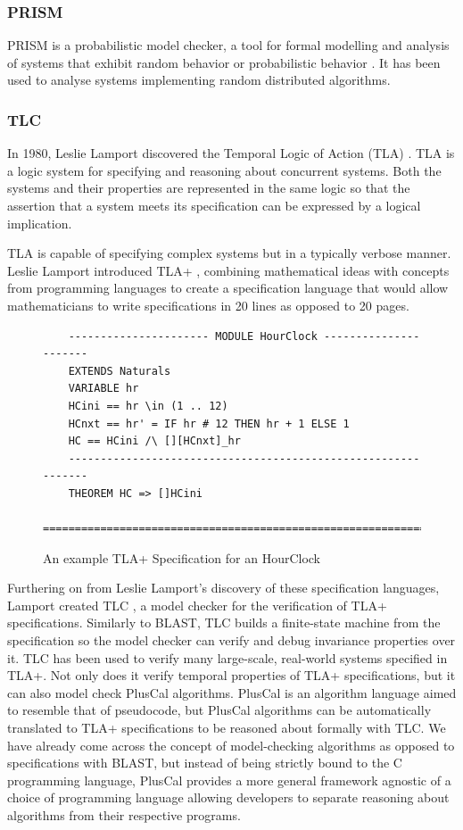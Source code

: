 \subsubsection*{\textbf{PRISM}}
PRISM is a probabilistic model checker, a tool for formal modelling and analysis of systems that exhibit random behavior or probabilistic behavior \cite{prism}. It has been used to analyse systems implementing random distributed algorithms.

\subsubsection*{\textbf{TLC}}
In 1980, Leslie Lamport discovered the Temporal Logic of Action (TLA) \cite{tla}. TLA is a logic system for specifying and reasoning about concurrent systems. Both the systems and their properties are represented in the same logic so that the assertion that a system meets its specification can be expressed by a logical implication.
\par
TLA is capable of specifying complex systems but in a typically verbose manner. Leslie Lamport introduced TLA+ \cite{tlaplus}, combining mathematical ideas with concepts from programming languages to create a specification language that would allow mathematicians to write specifications in 20 lines as opposed to 20 pages.
\begin{figure}[H]
    \begin{verbatim}
    ---------------------- MODULE HourClock ----------------------
    EXTENDS Naturals
    VARIABLE hr
    HCini == hr \in (1 .. 12)
    HCnxt == hr' = IF hr # 12 THEN hr + 1 ELSE 1
    HC == HCini /\ [][HCnxt]_hr
    --------------------------------------------------------------
    THEOREM HC => []HCini
    ==============================================================
    \end{verbatim}
    \caption{An example TLA+ Specification for an HourClock \cite{tlaplus}}
    \label{fig:hourclock_spec}
\end{figure}
\par
Furthering on from Leslie Lamport's discovery of these specification languages, Lamport created TLC \cite{tlc}, a model checker for the verification of TLA+ specifications. Similarly to BLAST, TLC builds a finite-state machine from the specification so the model checker can verify and debug invariance properties over it. TLC has been used to verify many large-scale, real-world systems specified in TLA+. Not only does it verify temporal properties of TLA+ specifications, but it can also model check PlusCal \cite{pluscal} algorithms. PlusCal is an algorithm language aimed to resemble that of pseudocode, but PlusCal algorithms can be automatically translated to TLA+ specifications to be reasoned about formally with TLC. We have already come across the concept of model-checking algorithms as opposed to specifications with BLAST, but instead of being strictly bound to the C programming language, PlusCal provides a more general framework agnostic of a choice of programming language allowing developers to separate reasoning about algorithms from their respective programs.


